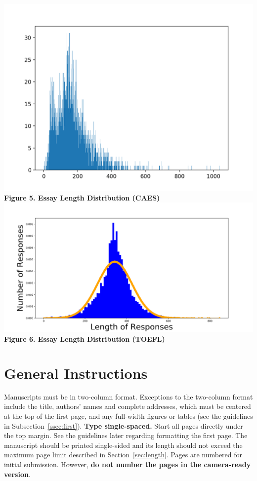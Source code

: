 \documentclass[11pt,a4paper]{article}
\begin{document}
\begin{center}
	\includegraphics[scale=0.8]{lengthD}\\
	\textbf{Figure 5. Essay Length Distribution (CAES)}
	\includegraphics[scale=0.4]{Figure1}\\
	\textbf{Figure 6. Essay Length Distribution (TOEFL)}
\end{center}

\section{General Instructions}

Manuscripts must be in two-column format.  Exceptions to the
two-column format include the title, authors' names and complete
addresses, which must be centered at the top of the first page, and
any full-width figures or tables (see the guidelines in
Subsection~\ref{ssec:first}). \textbf{Type single-spaced.}  Start all
pages directly under the top margin. See the guidelines later
regarding formatting the first page.  The manuscript should be
printed single-sided and its length
should not exceed the maximum page limit described in Section~\ref{sec:length}.
Pages are numbered for  initial submission. However, \textbf{do not number the pages in the camera-ready version}.
\end{document}
